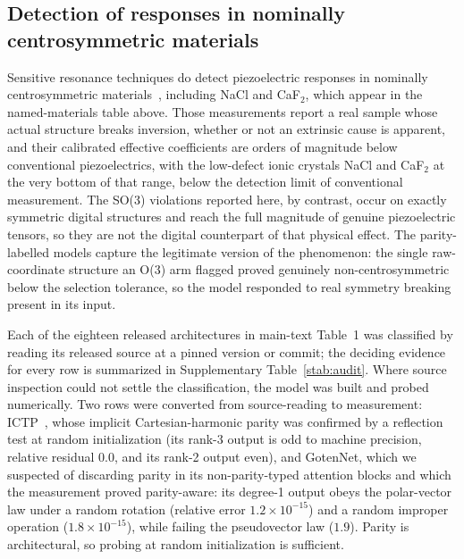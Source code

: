 \subsection*{Detection of responses in nominally centrosymmetric materials}

Sensitive resonance techniques do detect piezoelectric responses in nominally centrosymmetric materials~\cite{aktas2021nominally}, including NaCl and CaF$_2$, which appear in the named-materials table above. Those measurements report a real sample whose actual structure breaks inversion, whether or not an extrinsic cause is apparent, and their calibrated effective coefficients are orders of magnitude below conventional piezoelectrics, with the low-defect ionic crystals NaCl and CaF$_2$ at the very bottom of that range, below the detection limit of conventional measurement. The SO(3) violations reported here, by contrast, occur on exactly symmetric digital structures and reach the full magnitude of genuine piezoelectric tensors, so they are not the digital counterpart of that physical effect. The parity-labelled models capture the legitimate version of the phenomenon: the single raw-coordinate structure an O(3) arm flagged proved genuinely non-centrosymmetric below the selection tolerance, so the model responded to real symmetry breaking present in its input.


\label{snote:audit}

Each of the eighteen released architectures in main-text Table~1 was classified by reading its released source at a pinned version or commit; the deciding evidence for every row is summarized in Supplementary Table~\ref{stab:audit}. Where source inspection could not settle the classification, the model was built and probed numerically. Two rows were converted from source-reading to measurement: ICTP~\cite{zaverkin2024ictp}, whose implicit Cartesian-harmonic parity was confirmed by a reflection test at random initialization (its rank-3 output is odd to machine precision, relative residual $0.0$, and its rank-2 output even), and GotenNet, which we suspected of discarding parity in its non-parity-typed attention blocks and which the measurement proved parity-aware: its degree-1 output obeys the polar-vector law under a random rotation (relative error $1.2\times10^{-15}$) and a random improper operation ($1.8\times10^{-15}$), while failing the pseudovector law ($1.9$). Parity is architectural, so probing at random initialization is sufficient.

